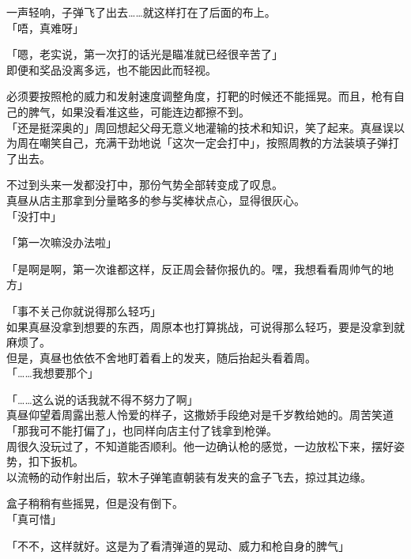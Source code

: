 一声轻响，子弹飞了出去……就这样打在了后面的布上。\\

「唔，真难呀」

「嗯，老实说，第一次打的话光是瞄准就已经很辛苦了」\\

即便和奖品没离多远，也不能因此而轻视。

必须要按照枪的威力和发射速度调整角度，打靶的时候还不能摇晃。而且，枪有自己的脾气，如果没看准这些，可能连边都擦不到。\\

「还是挺深奥的」周回想起父母无意义地灌输的技术和知识，笑了起来。真昼误以为周在嘲笑自己，充满干劲地说「这次一定会打中」，按照周教的方法装填子弹打了出去。

不过到头来一发都没打中，那份气势全部转变成了叹息。\\

真昼从店主那拿到分量略多的参与奖棒状点心，显得很灰心。\\

「没打中」

「第一次嘛没办法啦」

「是啊是啊，第一次谁都这样，反正周会替你报仇的。嘿，我想看看周帅气的地方」

「事不关己你就说得那么轻巧」\\

如果真昼没拿到想要的东西，周原本也打算挑战，可说得那么轻巧，要是没拿到就麻烦了。\\

但是，真昼也依依不舍地盯着看上的发夹，随后抬起头看着周。\\

「……我想要那个」

「……这么说的话我就不得不努力了啊」\\

真昼仰望着周露出惹人怜爱的样子，这撒娇手段绝对是千岁教给她的。周苦笑道「那我可不能打偏了」，也同样向店主付了钱拿到枪弹。\\

周很久没玩过了，不知道能否顺利。他一边确认枪的感觉，一边放松下来，摆好姿势，扣下扳机。\\

以流畅的动作射出后，软木子弹笔直朝装有发夹的盒子飞去，掠过其边缘。

盒子稍稍有些摇晃，但是没有倒下。\\

「真可惜」

「不不，这样就好。这是为了看清弹道的晃动、威力和枪自身的脾气」\\

